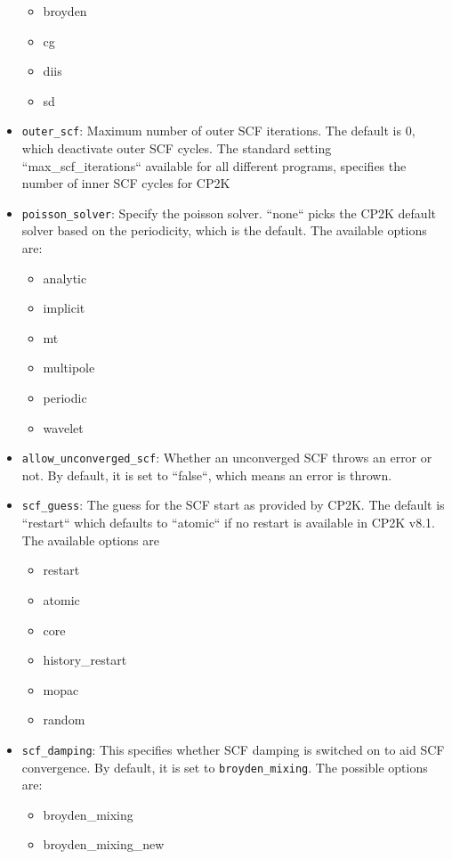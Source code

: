 \documentclass[]{tufte-book}
\begin{document}
\begin{itemize}
        \begin{itemize}
		\item broyden
		\item cg
		\item diis
		\item sd
        \end{itemize}
	\item \texttt{outer\_scf}: Maximum number of outer SCF iterations. The default is 0, which deactivate outer SCF cycles. The standard setting ``max\_scf\_iterations`` available for all different programs, specifies the number of inner SCF cycles for \textsc{CP2K}
	\item \texttt{poisson\_solver}: Specify the poisson solver. ``none`` picks the \textsc{CP2K} default solver based on the periodicity, which is the default. The available options are:
        \begin{itemize}
		\item analytic
		\item implicit
		\item mt
		\item multipole
		\item periodic
		\item wavelet
        \end{itemize}
	\item \texttt{allow\_unconverged\_scf}: Whether an unconverged SCF throws an error or not. By default, it is set to ``false``, which means an error is thrown.
	\item \texttt{scf\_guess}: The guess for the SCF start as provided by \textsc{CP2K}. The default is ``restart`` which defaults to ``atomic`` if no restart is available in \textsc{CP2K} v8.1. The available options are
        \begin{itemize}
		\item restart
		\item atomic
		\item core
		\item history\_restart
		\item mopac
		\item random
        \end{itemize}
	\item \texttt{scf\_damping}: This specifies whether SCF damping is switched on to aid SCF convergence. By default, it is set to \texttt{broyden\_mixing}. The possible options are:
        \begin{itemize}
 		\item broyden\_mixing
                \item broyden\_mixing\_new

\end{itemize}
\end{itemize}
\end{document}
